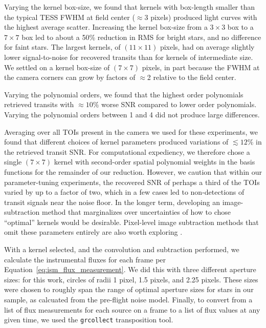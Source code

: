 \documentclass[12pt,twocolumn,tighten]{aastex62}
\begin{document}
Varying the kernel box-size, we found that kernels with box-length smaller than the 
typical TESS FWHM at field center ($\approx$3 pixels) produced light curves
with the highest average scatter.
Increasing the kernel box-size from a $3\times3$ box to a $7\times7$ box led
to about a 50\% reduction in RMS for bright stars, and no difference for 
faint stars.
The largest kernels, of $(11\times11)$ pixels, had on average slightly lower 
signal-to-noise for recovered transits than for kernels of intermediate size.
We settled on a kernel box-size of $(7\times7)$ pixels, in part because the 
FWHM at the camera corners can grow by factors of $\approx$2 relative to the 
field center.

Varying the polynomial orders, we found that the highest order polynomials 
retrieved transits with $\approx10\%$ worse SNR compared to lower order
polynomials.
Varying the polynomial orders between 1 and 4 did not produce large 
differences.

Averaging over all TOIs present in the camera we used for these experiments, 
we found that different choices 
of kernel parameters produced variations of $\lesssim 12\%$ in the retrieved 
transit SNR.  
For computational expediency, we therefore chose a single
$(7\times 7)$ kernel with 
second-order spatial polynomial weights in the basis functions for the
remainder of our reduction.
However, we caution that within our parameter-tuning experiments, the 
recovered SNR of perhaps a third of the TOIs varied by up to a factor of two,
which in a few 
cases led to non-detections of transit signals near the noise floor.
In the longer term, developing an image-subtraction method that marginalizes 
over uncertainties of how to chose ``optimal'' kernels would be desirable.
Pixel-level image subtraction methods that omit these 
parameters entirely 
are also worth exploring \citep{wang_pixel-level_2017}.

With a kernel selected, and the convolution and subtraction performed, 
we calculate the instrumental fluxes for each frame per 
Equation~\ref{eq:ism_flux_measurement}. 
We did this with three different aperture sizes: for this work, circles
of radii 1 pixel, 1.5 pixels, and 2.25 pixels.
These sizes were chosen to roughly span the range of optimal aperture
sizes for stars in our sample, as calcuated from the pre-flight
\citet{Sullivan_et_al_2015} noise model.
Finally, to convert from a list of 
flux measurements for each source on a frame to a list of flux values
at any given time, we used the 
\texttt{grcollect} transposition tool.
\end{document}
